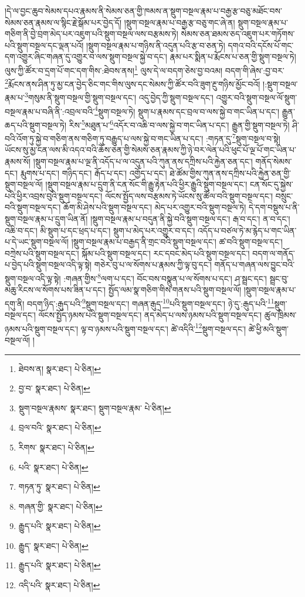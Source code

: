 །དེ་ལ་བྱང་ཆུབ་སེམས་དཔའ་རྣམས་ནི་སེམས་ཅན་གྱི་ཁམས་ན་སྡུག་བསྔལ་རྣམ་པ་བརྒྱ་རྩ་བཅུ་མཐོང་བས་སེམས་ཅན་རྣམས་ལ་སྙིང་རྗེ་སྒོམ་པར་བྱེད་དོ། །སྡུག་བསྔལ་རྣམ་པ་བརྒྱ་རྩ་བཅུ་གང་ཞེ་ན། སྡུག་བསྔལ་རྣམ་པ་གཅིག་ནི་བྱེ་བྲག་མེད་པར་འཇུག་པའི་སྡུག་བསྔལ་ལས་བརྩམས་ཏེ། སེམས་ཅན་ཐམས་ཅད་འཇུག་པར་གཏོགས་པའི་སྡུག་བསྔལ་དང་ལྡན་པའོ། །སྡུག་བསྔལ་རྣམ་པ་གཉིས་ནི་འདུན་པའི་རྩ་བ་ཅན་ཏེ། དགའ་བའི་དངོས་པོ་གང་དག་འགྱུར་ཞིང་གཞན་དུ་འགྱུར་བ་ལས་སྡུག་བསྔལ་སྐྱེ་བ་དང་། རྣམ་པར་སྨིན་པ་རྨོངས་པ་ཅན་གྱི་སྡུག་བསྔལ་ཏེ། ལུས་ཀྱི་ཚོར་བ་དྲག་པོ་གང་དག་གིས་:ཐེབས་ནས།\footnote{ཐེབས་ན།  སྣར་ཐང་།  པེ་ཅིན། } ལུས་དེ་ལ་བདག་ཅེས་བྱ་བའམ། བདག་གི་ཞེས་:བྱ་བར་\footnote{བྱ་བ་  སྣར་ཐང་།  པེ་ཅིན། }རྨོངས་ནས་ཤིན་ཏུ་མྱ་ངན་བྱེད་ཅིང་གང་གིས་ལུས་དང་སེམས་ཀྱི་ཚོར་བའི་ཟུག་རྔུ་གཉིས་མྱོང་བའོ། །:སྡུག་བསྔལ་རྣམ་པ་\footnote{སྡུག་བསྔལ་རྣམས་  སྣར་ཐང་། སྡུག་བསྔལ་རྣམ་  པེ་ཅིན། }གསུམ་ནི་སྡུག་བསྔལ་གྱི་སྡུག་བསྔལ་དང་། འདུ་བྱེད་ཀྱི་སྡུག་བསྔལ་དང་། འགྱུར་བའི་སྡུག་བསྔལ་ལོ་སྡུག་བསྔལ་རྣམ་པ་བཞི་ནི་:འབྲལ་བའི་\footnote{བྲལ་བའི་  སྣར་ཐང་།  པེ་ཅིན། }སྡུག་བསྔལ་ཏེ། སྡུག་པ་རྣམས་དང་བྲལ་བ་ལས་སྐྱེ་བ་གང་ཡིན་པ་དང་། རྒྱུན་ཆད་པའི་སྡུག་བསྔལ་ཏེ། རིས་\footnote{རིགས་  སྣར་ཐང་།  པེ་ཅིན། }མཐུན་པ་\footnote{པའི་  སྣར་ཐང་།  པེ་ཅིན། }འདོར་བ་འཆི་བ་ལས་སྐྱེ་བ་གང་ཡིན་པ་དང་། རྒྱུན་གྱི་སྡུག་བསྔལ་ཏེ། ཤི་བའི་འོག་ཏུ་སྐྱེ་བ་གཅིག་ནས་གཅིག་ཏུ་བརྒྱུད་པ་ལས་སྐྱེ་བ་གང་ཡིན་པ་དང་། :གཏན་དུ་\footnote{གཏན་ཏུ་  སྣར་ཐང་།  པེ་ཅིན། }སྡུག་བསྔལ་བ་སྟེ། ཡོངས་སུ་མྱ་ངན་ལས་མི་འདའ་བའི་ཆོས་ཅན་གྱི་སེམས་ཅན་རྣམས་ཀྱི་ཉེ་བར་ལེན་པའི་ཕུང་པོ་ལྔ་པོ་གང་ཡིན་པ་རྣམས་སོ། །སྡུག་བསྔལ་རྣམ་པ་ལྔ་ནི་འདོད་པ་ལ་འདུན་པའི་ཀུན་ནས་དཀྲིས་པའི་རྐྱེན་ཅན་དང་། གནོད་སེམས་དང་། རྨུགས་པ་དང་། གཉིད་དང་། རྒོད་པ་དང་། འགྱོད་པ་དང་། ཐེ་ཚོམ་གྱིས་ཀུན་ནས་དཀྲིས་པའི་རྐྱེན་ཅན་གྱི་སྡུག་བསྔལ་ལོ། །སྡུག་བསྔལ་རྣམ་པ་དྲུག་ནི་ངན་སོང་གི་རྒྱུ་རྟེན་པའི་ཕྱིར་རྒྱུའི་སྡུག་བསྔལ་དང་། ངན་སོང་དུ་སྐྱེས་པའི་ཕྱིར་འབྲས་བུའི་སྡུག་བསྔལ་དང་། ལོངས་སྤྱོད་ལས་བརྩམས་ཏེ་ཡོངས་སུ་ཚོལ་བའི་སྡུག་བསྔལ་དང་། བསྲུང་བའི་སྡུག་བསྔལ་དང་། ཆོག་མི་ཤེས་པའི་སྡུག་བསྔལ་དང་། མེད་པར་འགྱུར་བའི་སྡུག་བསྔལ་ཏེ། དེ་དག་བསྡུས་པ་ནི་སྡུག་བསྔལ་རྣམ་པ་དྲུག་ཡིན་ནོ། །སྡུག་བསྔལ་རྣམ་པ་བདུན་ནི་སྐྱེ་བའི་སྡུག་བསྔལ་དང་། རྒ་བ་དང་། ན་བ་དང་། འཆི་བ་དང་། མི་སྡུག་པ་དང་ཕྲད་པ་དང་། སྡུག་པ་མེད་པར་འགྱུར་བ་དང་། འདོད་པ་བཙལ་ཏེ་མ་རྙེད་པ་གང་ཡིན་པ་དེ་ཡང་སྡུག་བསྔལ་ལོ། །སྡུག་བསྔལ་རྣམ་པ་བརྒྱད་ནི་གྲང་བའི་སྡུག་བསྔལ་དང་། ཚ་བའི་སྡུག་བསྔལ་དང་། བཀྲེས་པའི་སྡུག་བསྔལ་དང་། སྐོམ་པའི་སྡུག་བསྔལ་དང་། རང་དབང་མེད་པའི་སྡུག་བསྔལ་དང་། བདག་ལ་གནོད་པ་བྱེད་པའི་སྡུག་བསྔལ་འདི་ལྟ་སྟེ། གཅེར་བུ་པ་ལ་སོགས་པ་རྣམས་ཀྱི་ལྟ་བུ་དང་། གནོད་པ་གཞན་ལས་བྱུང་བའི་སྡུག་བསྔལ་འདི་ལྟ་སྟེ། :གཞན་གྱིས་\footnote{གཞན་གྱི་  སྣར་ཐང་།  པེ་ཅིན། }ལག་པ་དང་། བོང་བས་བསྣུན་པ་ལ་སོགས་པ་དང་། ཤ་སྦྲང་དང་། སྦྲང་བུ་མཆུ་རིངས་ལ་སོགས་པས་ཟིན་པ་དང་། སྤྱོད་ལམ་སྣ་གཅིག་གིས་གནས་པའི་སྡུག་བསྔལ་ལོ། །སྡུག་བསྔལ་རྣམ་པ་དགུ་ནི། བདག་ཉིད་:རྒུད་པའི་\footnote{རྒྱུད་པའི་  སྣར་ཐང་།  པེ་ཅིན། }སྡུག་བསྔལ་དང་། གཞན་རྒུད་\footnote{རྒྱུད་  སྣར་ཐང་།  པེ་ཅིན། }པའི་སྡུག་བསྔལ་དང་། ཉེ་དུ་:རྒུད་པའི་\footnote{རྒྱུད་པའི་  སྣར་ཐང་།  པེ་ཅིན། }སྡུག་བསྔལ་དང་། ལོངས་སྤྱོད་ཉམས་པའི་སྡུག་བསྔལ་དང་། ནད་མེད་པ་ལས་ཉམས་པའི་སྡུག་བསྔལ་དང་། ཚུལ་ཁྲིམས་ཉམས་པའི་སྡུག་བསྔལ་དང་། ལྟ་བ་ཉམས་པའི་སྡུག་བསྔལ་དང་། ཚེ་འདིའི་\footnote{འདི་པའི་  སྣར་ཐང་།  པེ་ཅིན། }སྡུག་བསྔལ་དང་། ཚེ་ཕྱི་མའི་སྡུག་བསྔལ་ལོ། །
